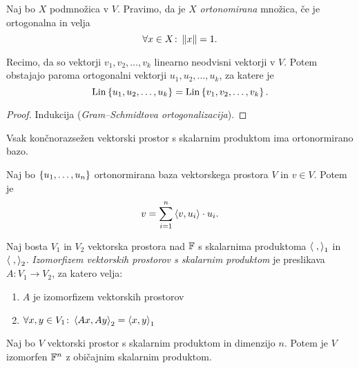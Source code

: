 \documentclass[12pt, a4paper]{article}
\begin{document}
\obvs

\begin{definicija}
Naj bo $X$ podmnožica v $V$. Pravimo, da je $X$ \emph{ortonomirana} množica, če je ortogonalna in velja
\[
\forall x\in X\colon \left\lVert x\right\rVert=1.
\]
\end{definicija}

\begin{izrek}
Recimo, da so vektorji $v_1,v_2,\dots,v_k$ linearno neodvisni vektorji v $V$. Potem obstajajo paroma ortogonalni vektorji $u_1,u_2,\dots,u_k$, za katere je
\[
\operatorname{Lin}\left\{u_1,u_2,\dots,u_k\right\}=\operatorname{Lin}\left\{v_1,v_2,\dots,v_k\right\}.
\]
\end{izrek}

\begin{proof}
Indukcija (\emph{Gram--Schmidtova ortogonalizacija}).
\end{proof}

\begin{posledica}
Vsak končnorazsežen vektorski prostor s skalarnim produktom ima ortonormirano bazo.
\end{posledica}

\begin{trditev}
Naj bo $\left\{u_1,\dots,u_n\right\}$ ortonormirana baza vektorskega prostora $V$ in $v\in V$. Potem je
\[
v=\sum_{i=1}^n\left\langle v,u_i\right\rangle\cdot u_i.
\]
\end{trditev}

\obvs

\begin{definicija}
Naj bosta $V_1$ in $V_2$ vektorska prostora nad $\mathbb{F}$ s skalarnima produktoma $\left\langle \;,\right\rangle_1$ in $\left\langle \;,\right\rangle_2$. \emph{Izomorfizem vektorskih prostorov s skalarnim produktom} je preslikava $A\colon V_1\to V_2$, za katero velja:

\begin{enumerate}[label=\roman*)]
\item $A$ je izomorfizem vektorskih prostorov
\item $\forall x,y\in V_1\colon \left\langle Ax,Ay\right\rangle_2=\left\langle x,y\right\rangle_1$
\end{enumerate}
\end{definicija}

\begin{izrek}
Naj bo $V$ vektorski prostor s skalarnim produktom in dimenzijo $n$. Potem je $V$ izomorfen $\mathbb{F}^n$ z običajnim skalarnim produktom.
\end{izrek}
\end{document}
